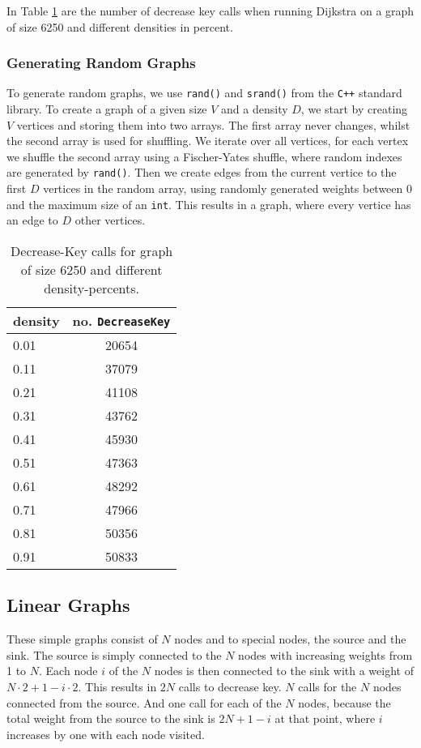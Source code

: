 \documentclass[a4paper,10pt]{article}
\begin{document}
In Table \ref{dec-key-call-diff-dens} are the number of decrease key calls when running Dijkstra on a graph of size 6250 and different densities in percent.

\subsubsection*{Generating Random Graphs}
To generate random graphs, we use \texttt{rand()} and \texttt{srand()} from the \texttt{C++} standard library. To create a graph of a given size $V$ and a density $D$, we start by creating $V$ vertices and storing them into two arrays. The first array never changes, whilst the second array is used for shuffling. We iterate over all vertices, for each vertex we shuffle the second array using a Fischer-Yates shuffle, where random indexes are generated by \texttt{rand()}. Then we create edges from the current vertice to the first $D$ vertices in the random array, using randomly generated weights between 0 and the maximum size of an \texttt{int}. This results in a graph, where every vertice has an edge to $D$ other vertices.

\begin{table}
  \begin{center}
    \begin{tabular}{l|c}
      density & no. \texttt{DecreaseKey} \\
      \hline
      0.01 & 20654\\
      0.11 & 37079\\
      0.21 & 41108\\
      0.31 & 43762\\
      0.41 & 45930\\
      0.51 & 47363\\
      0.61 & 48292\\
      0.71 & 47966\\
      0.81 & 50356\\
      0.91 & 50833
    \end{tabular}
    \caption{Decrease-Key calls for graph of size 6250 and different density-percents.}
    \label{dec-key-call-diff-dens}
  \end{center}
\end{table}

\subsection{Linear Graphs}
These simple graphs consist of $N$ nodes and to special nodes, the source and the sink. The source is simply connected to the $N$ nodes with increasing weights from 1 to $N$. Each node $i$ of the $N$ nodes is then connected to the sink with a weight of $N\cdot 2 +1 - i\cdot 2$. This results in $2N$ calls to decrease key. $N$ calls for the $N$ nodes connected from the source. And one call for each of the $N$ nodes, because the total weight from the source to the sink is $2N +1 -i$ at that point, where $i$ increases by one with each node visited.
\end{document}
